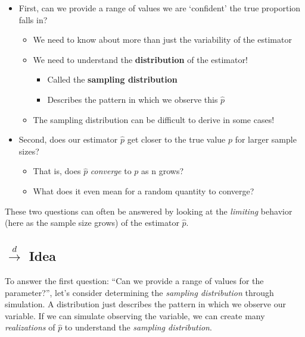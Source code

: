 \documentclass[
]{article}
\providecommand{\tightlist}{%
  \setlength{\itemsep}{0pt}\setlength{\parskip}{0pt}}
\begin{document}
\begin{itemize}
\tightlist
\item
  First, can we provide a range of values we are `confident' the true
  proportion falls in?

  \begin{itemize}
  \tightlist
  \item
    We need to know about more than just the variability of the
    estimator
  \item
    We need to understand the \textbf{distribution} of the estimator!

    \begin{itemize}
    \tightlist
    \item
      Called the \textbf{sampling distribution}
    \item
      Describes the pattern in which we observe this \(\hat{p}\)
    \end{itemize}
  \item
    The sampling distribution can be difficult to derive in some cases!
  \end{itemize}
\item
  Second, does our estimator \(\hat{p}\) get closer to the true value
  \(p\) for larger sample sizes?

  \begin{itemize}
  \tightlist
  \item
    That is, does \(\hat{p}\) \emph{converge} to \(p\) as n grows?
  \item
    What does it even mean for a random quantity to converge?
  \end{itemize}
\end{itemize}

These two questions can often be answered by looking at the
\emph{limiting} behavior (here as the sample size grows) of the
estimator \(\hat{p}\).

\hypertarget{stackreldrightarrow-idea}{%
\subsection{\texorpdfstring{\(\stackrel{d}{\rightarrow}\)
Idea}{\textbackslash stackrel\{d\}\{\textbackslash rightarrow\} Idea}}\label{stackreldrightarrow-idea}}

To answer the first question: ``Can we provide a range of values for the
parameter?'', let's consider determining the \emph{sampling
distribution} through simulation. A distribution just describes the
pattern in which we observe our variable. If we can simulate observing
the variable, we can create many \emph{realizations} of \(\hat{p}\) to
understand the \emph{sampling distribution}.
\end{document}
